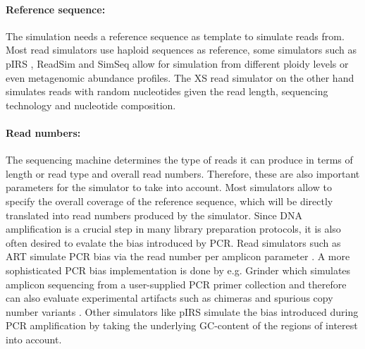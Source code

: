 \paragraph{Reference sequence:} The simulation needs a reference sequence as template to simulate reads from. Most read simulators use haploid sequences as reference, some simulators such as pIRS \citep{Hu2012}, ReadSim \citep{Lee006395} and SimSeq \citep{Earl2011} allow for simulation from different ploidy levels or even metagenomic abundance profiles. The XS read simulator \citep{Pratas2014} on the other hand simulates reads with random nucleotides given the read length, sequencing technology and nucleotide composition.

\paragraph{Read numbers:} The sequencing machine determines the type of reads it can produce in terms of length or read type and overall read numbers. Therefore, these are also important parameters for the simulator to take into account. Most simulators allow to specify the overall coverage of the reference sequence, which will be directly translated into read numbers produced by the simulator. Since DNA amplification is a crucial step in many library preparation protocols, it is also often desired to evalate the bias introduced by PCR. Read simulators such as ART \citep{Huang2012} simulate PCR bias via the read number per amplicon parameter \citep{Mardis2008}. A more sophisticated PCR bias implementation is done by e.g. Grinder \citep{Angly2012} which simulates amplicon sequencing from a user-supplied PCR primer collection and therefore can also evaluate experimental artifacts such as chimeras \citep{Haas2011} and spurious copy number variants \citep{Escalona2016}. Other simulators like pIRS simulate the bias introduced during PCR amplification by taking the underlying GC-content of the regions of interest into account. 

